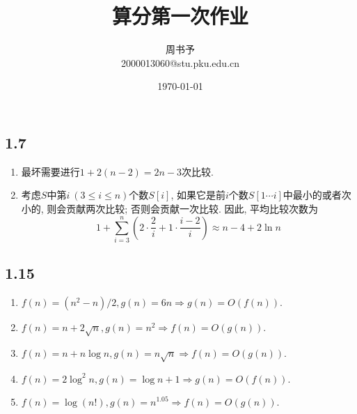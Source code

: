 \documentclass[8pt]{article}
\title{\heiti\zihao{1} 算分第一次作业}
\author{\kaishu\zihao{-3} 周书予\\2000013060@stu.pku.edu.cn}
\date{\today}
\def\le{\leqslant}
\begin{document}
\pagestyle{fancy}


\maketitle
\section{}
\iffalse
\subsection*{1.2}
\begin{enumerate}
	\item 第$i$轮\texttt{for}循环中需要进行$n - i$次比较, 因此最坏情况下比较次数是$\sum_{i=1}^{n-1}(n-i) = \frac{n(n-1)}{2}$.
	\item 当输入的$n$个数以严格降序排列时, 交换次数达到最大, 也为$\frac{n(n-1)}{2}$.
\end{enumerate}

\subsection*{1.6}
该算法实现了对于多项式$P(t) = \sum_{i=0}^{n}P[i]t^i$求$x$处的点值.

该算法需要$2n$次乘法与$n$次加法.
\fi

\subsection*{1.7}
\begin{enumerate}
	\item 最坏需要进行$1 + 2(n-2) = 2n-3$次比较.
	\item 考虑$S$中第$i\ (3 \le i \le n)$个数$S[i]$, 如果它是前$i$个数$S[1 \cdots i]$中最小的或者次小的, 则会贡献两次比较; 否则会贡献一次比较. 因此, 平均比较次数为$$1 + \sum_{i=3}^{n}\left(2\cdot \frac{2}{i} + 1 \cdot \frac{i-2}{i}\right) \approx n-4 + 2\ln n$$
\end{enumerate}

\iffalse
\subsection*{1.15}
\begin{enumerate}
	\item $f(n) = (n^2-n)/2, g(n) = 6n \Rightarrow g(n) = O(f(n)).$
	\item $f(n) = n + 2\sqrt n, g(n) = n^2 \Rightarrow f(n) = O(g(n)).$
	\item $f(n) = n + n\log n, g(n) = n\sqrt n \Rightarrow f(n) = O(g(n)).$
	\item $f(n) = 2\log^2n, g(n) = \log n + 1 \Rightarrow g(n) = O(f(n)).$
	\item $f(n) = \log(n!), g(n) = n^{1.05} \Rightarrow f(n) = O(g(n)).$
\end{enumerate}
\end{document}
